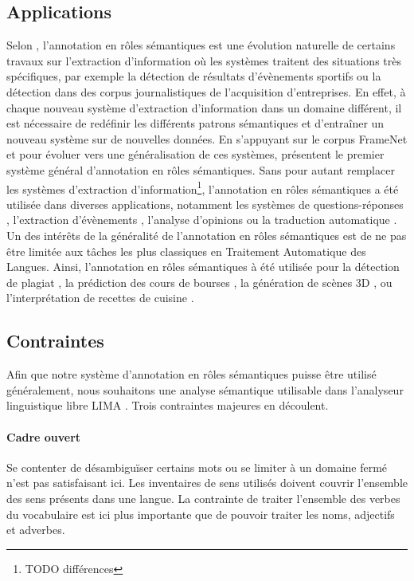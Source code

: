 \subsection{Applications}

Selon \cite{gildea2002automatic}, l'annotation en rôles sémantiques est une
évolution naturelle de certains travaux sur l'extraction d'information où les
systèmes traitent des situations très spécifiques, par exemple la détection de
résultats d'évènements sportifs ou la détection dans des corpus journalistiques
de l'acquisition d'entreprises. En effet, à chaque nouveau système d'extraction
d'information dans un domaine différent, il est nécessaire de redéfinir les
différents patrons sémantiques et d'entraîner un nouveau système sur de
nouvelles données. En s'appuyant sur le corpus FrameNet et pour évoluer vers
une généralisation de ces systèmes, \cite{gildea2002automatic} présentent le
premier système général d'annotation en rôles sémantiques. Sans pour autant
remplacer les systèmes d'extraction d'information\footnote{TODO différences},
l'annotation en rôles sémantiques a été utilisée dans diverses applications,
notamment les systèmes de questions-réponses \citep{shen2007using},
l'extraction d'évènements \citep{exner2011using},  l'analyse d'opinions
\citep{das2012structure} ou la traduction automatique
\citep{bazrafshan2013semantic}. Un des intérêts de la généralité de
l'annotation en rôles sémantiques est de ne pas être limitée aux tâches les
plus classiques en Traitement Automatique des Langues. Ainsi, l'annotation en
rôles sémantiques à été utilisée pour la détection de plagiat
\citep{osman2012improved}, la prédiction des cours de bourses
\citep{xie2013semantic}, la génération de scènes 3D \citep{chang2014semantic},
ou l'interprétation de recettes de cuisine \citep{malmaud2014cooking}.

\subsection{Contraintes}

Afin que notre système d'annotation en rôles sémantiques puisse être utilisé
généralement, nous souhaitons une analyse sémantique utilisable dans
l'analyseur linguistique libre LIMA \citep{besancon2010lima}. Trois contraintes
majeures en découlent.

\paragraph{Cadre ouvert} Se contenter de désambiguïser certains mots ou se
limiter à un domaine fermé n'est pas satisfaisant ici. Les inventaires de sens
utilisés doivent couvrir l'ensemble des sens présents dans une langue. La
contrainte de traiter l'ensemble des verbes du vocabulaire est ici plus
importante que de pouvoir traiter les noms, adjectifs et adverbes.

